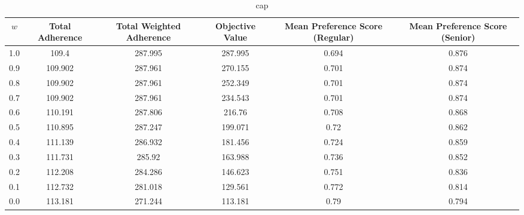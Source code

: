 \documentclass{article}
\begin{document}
\begin{multicols}{2}
\begin{table*}[ht]
\small
   \centering
   \begin{tabular}{ c | c | c | c | c | c }
$w$ & Total Adherence & Total Weighted Adherence & Objective Value & Mean Preference Score (Regular) & Mean Preference Score (Senior) \\ \hline
1.0 & 109.4 & 287.995 & 287.995 & 0.694 & 0.876 \\
0.9 & 109.902 & 287.961 & 270.155 & 0.701 & 0.874 \\
0.8 & 109.902 & 287.961 & 252.349 & 0.701 & 0.874 \\
0.7 & 109.902 & 287.961 & 234.543 & 0.701 & 0.874 \\
0.6 & 110.191 & 287.806 & 216.76 & 0.708 & 0.868 \\
0.5 & 110.895 & 287.247 & 199.071 & 0.72 & 0.862 \\
0.4 & 111.139 & 286.932 & 181.456 & 0.724 & 0.859 \\
0.3 & 111.731 & 285.92 & 163.988 & 0.736 & 0.852 \\
0.2 & 112.208 & 284.286 & 146.623 & 0.751 & 0.836 \\
0.1 & 112.732 & 281.018 & 129.561 & 0.772 & 0.814 \\
0.0 & 113.181 & 271.244 & 113.181 & 0.79 & 0.794 \\
   \end{tabular}
   \\[10pt]
   \caption{\small{cap}}
\end{table*}

\end{multicols}
\end{document}
